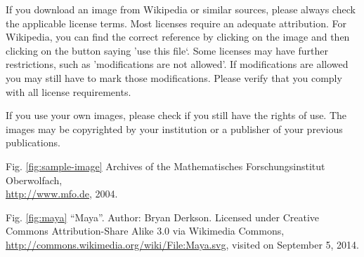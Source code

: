 \documentclass{snapshotmfo}
\begin{document}
If you download an image from Wikipedia or similar sources, please always check the applicable license terms. Most licenses require an adequate attribution. For Wikipedia, you can find the correct reference by clicking on the image and then clicking on the button saying 'use this file‘. Some licenses may have further restrictions, such as 'modifications are not allowed'. If modifications are allowed you may still have to mark those modifications. Please verify that you comply with all license requirements.

If you use your own images, please check if you still have the rights of use. The images may be copyrighted by your institution or a publisher of your previous publications.

\clearpage

\begin{imagecredits}
  \item[Fig. \ref{fig:sample-image}] Archives of the Mathematisches Forschungsinstitut Oberwolfach,\\\url{http://www.mfo.de}, 2004.
  \item[Fig. \ref{fig:maya}] ``Maya''. Author: Bryan Derkson. Licensed under Creative Commons Attribution-Share Alike 3.0 via Wikimedia Commons, \url{http://commons.wikimedia.org/wiki/File:Maya.svg}, visited on September 5, 2014.
\end{imagecredits}
\end{document}
